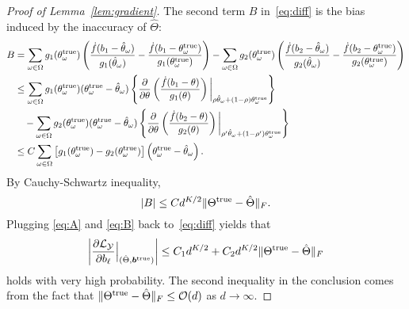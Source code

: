 \documentclass[11pt]{article}
\theoremstyle{plain}
\theoremstyle{definition}
\begin{document}
\begin{proof}[Proof of Lemma~\ref{lem:gradient}]
The second term $B$ in~\eqref{eq:diff} is the bias induced by the inaccuracy of $\hat \Theta$:
\begin{align}
B&=\sum_{\omega \in \Omega}g_1(\theta^{\text{true}}_\omega) \left(  \frac{\dot{f}(b_1-\hat \theta_\omega)}{g_1(\hat \theta_\omega)}-\frac{\dot{f}(b_1-\theta^{\text{true}}_\omega)}{g_1(\theta^{\text{true}}_\omega)}\right)-\sum_{\omega \in \Omega}g_2(\theta^{\text{true}}_\omega) \left(  \frac{\dot{f}(b_2-\hat \theta_\omega)}{g_2(\hat \theta_\omega)}-\frac{\dot{f}(b_2-\theta^{\text{true}}_\omega)}{g_2(\theta^{\text{true}}_\omega)}\right) \notag\\
&\leq \sum_{\omega \in \Omega} g_1(\theta^{\text{true}}_\omega)  (\theta^{\text{true}}_\omega-\hat \theta_\omega )\left\{{\partial \over \partial \theta}\left({\dot{f}(b_1-\theta)\over g_1(\theta)}\right)\bigg|_{\rho \hat \theta_\omega+(1-\rho)\theta^{\text{true}}_\omega}\right\}\notag\\
&\quad - \sum_{\omega \in \Omega} g_2(\theta^{\text{true}}_\omega) (\theta^{\text{true}}_\omega-\hat \theta_\omega )  \left\{{\partial \over \partial \theta}\left({\dot{f}(b_2-\theta)\over g_2(\theta)}\right)\bigg|_{\rho' \hat \theta_\omega+(1-\rho')\theta^{\text{true}}_\omega}\right\} \notag\\
&\leq C\sum_{\omega\in\Omega} \left[g_1(\theta^{\text{true}}_\omega)- g_2(\theta^{\text{true}}_\omega)\right]\left(\theta^{\text{true}}_\omega-\hat \theta_\omega \right).
\end{align}
By Cauchy-Schwartz inequality,
\begin{equation}\label{eq:B}
|B|\leq Cd^{K/2}\lVert\Theta^{\mathrm{true}}-\hat \Theta\rVert_F.
\end{equation}
Plugging \eqref{eq:A} and \eqref{eq:B} back to~\eqref{eq:diff} yields that
\[
\left|{\partial \mathcal{L}_{\mathcal{Y}}\over \partial b_\ell}\Big|_{(\hat \Theta, \bm{b}^{\mathrm{true}})}\right|\leq C_1d^{K/2}+C_2d^{K/2}\lVert\Theta^{\mathrm{true}}-\hat \Theta\rVert_F
\]
holds with very high probability. The second inequality in the conclusion comes from the fact that $\lVert\Theta^{\mathrm{true}}-\hat \Theta\rVert_F\leq \mathcal{O}(d)$ as $d\to \infty$. 
\end{proof}



\end{document}
